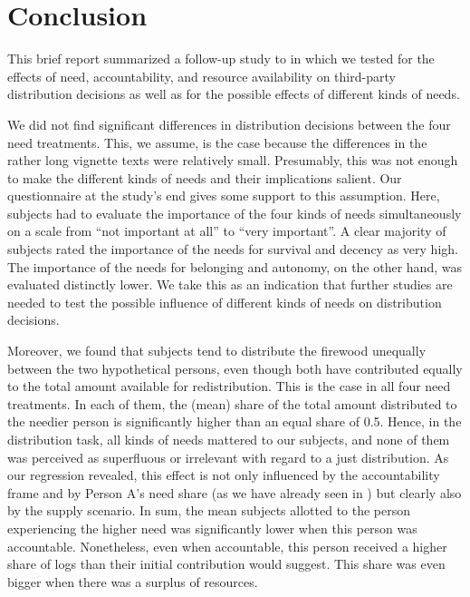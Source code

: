 \documentclass[egregdoesnotlikesansseriftitles]{scrartcl}
\begin{document}
\section{Conclusion}\label{sec:conclusion}
This brief report summarized a follow-up study to \cite{bauer_need_2020} in which we tested for the effects of need, accountability, and resource availability on third-party distribution decisions as well as for the possible effects of different kinds of needs.

We did not find significant differences in distribution decisions between the four need treatments.
This, we assume, is the case because the differences in the rather long vignette texts were relatively small.
Presumably, this was not enough to make the different kinds of needs and their implications salient.
Our questionnaire at the study's end gives some support to this assumption.
Here, subjects had to evaluate the importance of the four kinds of needs simultaneously on a scale from ``not important at all'' to ``very important''.
A clear majority of subjects rated the importance of the needs for survival and decency as very high.
The importance of the needs for belonging and autonomy, on the other hand, was evaluated distinctly lower.
We take this as an indication that further studies are needed to test the possible influence of different kinds of needs on distribution decisions.

Moreover, we found that subjects tend to distribute the firewood unequally between the two hypothetical persons, even though both have contributed equally to the total amount available for redistribution.
This is the case in all four need treatments.
In each of them, the (mean) share of the total amount distributed to the needier person is significantly higher than an equal share of 0.5.
Hence, in the distribution task, all kinds of needs mattered to our subjects, and none of them was perceived as superfluous or irrelevant with regard to a just distribution.
As our regression revealed, this effect is not only influenced by the accountability frame and by Person A's need share (as we have already seen in \citealt{bauer_need_2020}) but clearly also by the supply scenario.
In sum, the mean subjects allotted to the person experiencing the higher need was significantly lower when this person was accountable.
Nonetheless, even when accountable, this person received a higher share of logs than their initial contribution would suggest.
This share was even bigger when there was a surplus of resources.
\end{document}
